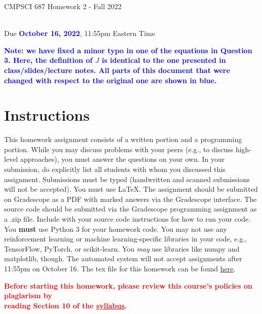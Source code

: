 \documentclass{article}
\newcommand{\TODO}[1]{\textcolor{blue}{\textbf{{#1}}}}
\newcommand{\WARNING}[1]{\textcolor{red}{\textbf{{#1}}}}
\begin{document}
\newpage
\begin{center}
    \begin{Large}
    CMPSCI 687 Homework 2 - Fall 2022 
    \end{Large}
    \\
    Due \TODO{October 16, 2022}, 11:55pm Eastern Time
\end{center}

\vspace{0.25in}

\noindent \textcolor{blue}{\textbf{Note: we have fixed a minor typo in one of the equations in Question 3. Here, the definition of $J$ is identical to the one presented in class/slides/lecture notes. All parts of this document that were changed with respect to the original one are shown in blue.}}

\section{Instructions}

This homework assignment consists of a written portion and a programming portion. While you may discuss problems with your peers (e.g., to discuss high-level approaches), you must answer the questions on your own. In your submission, do explicitly list all students with whom you discussed this assignment. Submissions must be typed (handwritten and scanned submissions will not be accepted). You must use \LaTeX. The assignment should be submitted on Gradescope as a PDF with marked answers via the Gradescope interface. The source code should be submitted via the Gradescope programming assignment as a .zip file. Include with your source code instructions for how to run your code. You \textbf{must} use Python 3 for your homework code. You may not use any reinforcement learning or machine learning-specific libraries in your code, e.g., TensorFlow, PyTorch, or scikit-learn. You \textit{may} use libraries like numpy and matplotlib, though. The automated system will not accept assignments after 11:55pm on October 16. The tex file for this homework can be found \href{https://people.cs.umass.edu/~bsilva/courses/CMPSCI_687/Fall2022/HWs/HW2_Source.zip}{here}.

\begin{center}
    \WARNING{Before starting this homework, please review this course's policies on plagiarism by  \\reading Section 10 of the \href{https://people.cs.umass.edu/~bsilva/courses/CMPSCI_687/Fall2022/F22_687_Syllabus_v2.pdf}{\textcolor{red}{\underline{syllabus}}}.}
\end{center}
\end{document}
